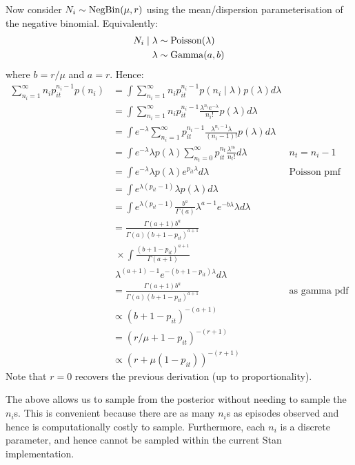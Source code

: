 \documentclass[thesis.tex]{subfiles}
\begin{document}
Now consider $N_i \sim \operatorname{NegBin}(\mu, r)$ using the
mean/dispersion parameterisation of the negative binomial. Equivalently:
\begin{align}
N_i \mid \lambda &\sim \operatorname{Poisson}(\lambda) \\
\lambda &\sim \operatorname{Gamma}(a, b)
\end{align}
where $b = r / \mu$ and $a = r$.
Hence:
\begin{align}
\sum_{n_i=1}^\infty n_i p_{it}^{n_i- 1} p(n_i) 
&= \int \sum_{n_i=1}^\infty n_i p_{it}^{n_i- 1} p(n_i \mid \lambda) p(\lambda) d\lambda \\
&= \int \sum_{n_i=1}^\infty n_i p_{it}^{n_i- 1} \frac{\lambda^{n_i} e^{-\lambda}}{n_i!} p(\lambda) d\lambda \\
&= \int e^{-\lambda} \sum_{n_i=1}^\infty p_{it}^{n_i- 1} \frac{\lambda^{n_i-1}\lambda }{(n_i-1)!} p(\lambda) d\lambda \\
&= \int e^{-\lambda} \lambda p(\lambda) \sum_{n_t=0}^\infty p_{it}^{n_t} \frac{\lambda^{n_t} }{n_t!} d\lambda &n_t = n_i - 1 \\
&= \int e^{-\lambda} \lambda p(\lambda) e^{p_{it}\lambda} d\lambda &\text{Poisson pmf} \\
&= \int e^{\lambda (p_{it} - 1)} \lambda p(\lambda) d\lambda \\
&= \int e^{\lambda (p_{it} - 1)} \frac{b^a}{\Gamma(a)} \lambda^{a-1} e^{-b\lambda} \lambda d\lambda \\
&= \frac{\Gamma(a+1)b^a}{\Gamma(a) (b+1-p_{it})^{a+1}} \\ 
  &\; \times \int \frac{(b+1-p_{it})^{a+1}}{\Gamma(a+1)} \\
  &\; \lambda^{(a+1)-1} e^{-(b+1-p_{it})\lambda} d\lambda \\
&= \frac{\Gamma(a+1)b^a}{\Gamma(a) (b+1-p_{it})^{a+1}} &\text{as gamma pdf} \\
&\propto (b+1-p_{it})^{-(a+1)} \\
&= (r/\mu+1-p_{it})^{-(r+1)} \\
&\propto (r+\mu (1-p_{it}))^{-(r+1)}
\end{align}
Note that $r=0$ recovers the previous derivation (up to
proportionality).

The above allows us to sample from the posterior without needing to
sample the $n_i$s. This is convenient because there are as many
$n_i$s as episodes observed and hence is computationally costly to
sample. Furthermore, each $n_i$ is a discrete parameter, and hence
cannot be sampled within the current Stan implementation.
\end{document}
